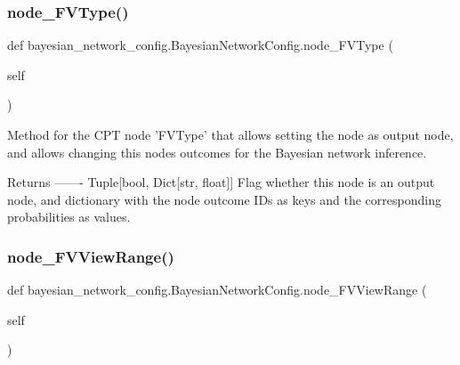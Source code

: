 \subsubsection{\texorpdfstring{node\+\_\+\+F\+V\+Type()}{node\_FVType()}}
{\footnotesize\ttfamily def bayesian\+\_\+network\+\_\+config.\+Bayesian\+Network\+Config.\+node\+\_\+\+F\+V\+Type (\begin{DoxyParamCaption}\item[{}]{self }\end{DoxyParamCaption})}

\begin{DoxyVerb}Method for the CPT node 'FVType' that allows setting the node as output node,
and allows changing this nodes outcomes for the Bayesian network inference.

Returns
-------
Tuple[bool, Dict[str, float]]
    Flag whether this node is an output node, and dictionary with the node outcome IDs as keys
    and the corresponding probabilities as values.
\end{DoxyVerb}
 \mbox{\label{classbayesian__network__config_1_1_bayesian_network_config_a14bac441795a8f3c96df9342dff6ecc2}} 
\subsubsection{\texorpdfstring{node\+\_\+\+F\+V\+View\+Range()}{node\_FVViewRange()}\hspace{0.1cm}{\footnotesize\ttfamily [1/3]}}
{\footnotesize\ttfamily def bayesian\+\_\+network\+\_\+config.\+Bayesian\+Network\+Config.\+node\+\_\+\+F\+V\+View\+Range (\begin{DoxyParamCaption}\item[{}]{self }\end{DoxyParamCaption})}

